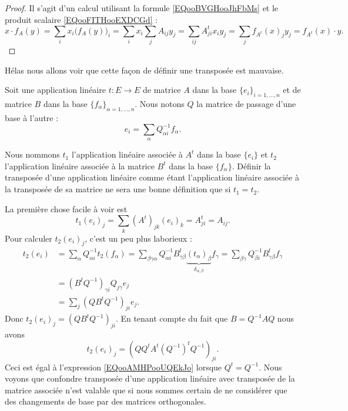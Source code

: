 \begin{proof}
	Il s'agit d'un calcul utilisant la formule \eqref{EQooBVGHooJhFbMs} et le produit scalaire \eqref{EQooFITHooEXDCGd} :
	\begin{equation}
		x\cdot f_A(y)=\sum_ix_i\big( f_A(y) \big)_i=\sum_ix_i\sum_jA_{ij}y_j=\sum_{ij}A^t_{ji}x_iy_j=\sum_jf_{A^t}(x)_jy_j=f_{A^t}(x)\cdot y.
	\end{equation}
\end{proof}

Hélas nous allons voir que cette façon de définir une transposée est mauvaise.

Soit une application linéaire \( t\colon E\to E\) de matrice \( A\) dans la base \( \{ e_i \}_{i=1,\ldots, n}\) et de matrice \( B\) dans la base \( \{ f_{\alpha} \}_{\alpha=1,\ldots, n}\). Nous notons \( Q\) la matrice de passage d'une base à l'autre :
\begin{equation}
	e_i=\sum_{\alpha}Q_{\alpha i}^{-1}f_{\alpha}.
\end{equation}

Nous nommons \( t_1\) l'application linéaire associée à \( A^t\) dans la base \( \{ e_i \}\) et \( t_2\) l'application linéaire associée à la matrice \( B^t\) dans la base \( \{ f_{\alpha} \}\). Définir la transposée d'une application linéaire comme étant l'application linéaire associée à la transposée de sa matrice ne sera une bonne définition que si \( t_1=t_2\).

La première chose facile à voir est
\begin{equation}        \label{EQooAMHPooUQEkJo}
	t_1(e_i)_j=\sum_k(A^t)_{jk}(e_i)_k=A^t_{ji}=A_{ij}.
\end{equation}
Pour calculer \( t_2(e_i)_j\), c'est un peu plus laborieux :
\begin{subequations}
	\begin{align}
		t_2(e_i) & =\sum_{\alpha}Q_{\alpha i}^{-1} t_2(f_\alpha)=\sum_{\beta\gamma\alpha}Q_{\alpha i}^{-1}B^t_{\gamma\beta}\underbrace{(t_{\alpha})_{\beta}}_{\delta_{\alpha,\beta}}f_{\gamma}=\sum_{\beta\gamma}Q_{\beta i}^{-1}B^t_{\gamma\beta}f_{\gamma} \\
		         & =(B^tQ^{-1})_{\gamma i}Q_{j\gamma}e_j                                                                                                                                                                                                     \\
		         & =\sum_j(QB^tQ^{-1})_{ji}e_j.
	\end{align}
\end{subequations}
Donc \( t_2(e_i)_j=(QB^tQ^{-1})_{ji}\). En tenant compte du fait que \( B=Q^{-1}AQ\) nous avons
\begin{equation}
	t_2(e_i)_j=(QQ^tA^t(Q^{-1})^tQ^{-1})_{ji}.
\end{equation}
Ceci est égal à l'expression \eqref{EQooAMHPooUQEkJo} lorsque \( Q^t=Q^{-1}\). Nous voyons que confondre transposée d'une application linéaire avec transposée de la matrice associée n'est valable que si nous sommes certain de ne considérer que des changements de base par des matrices orthogonales.

